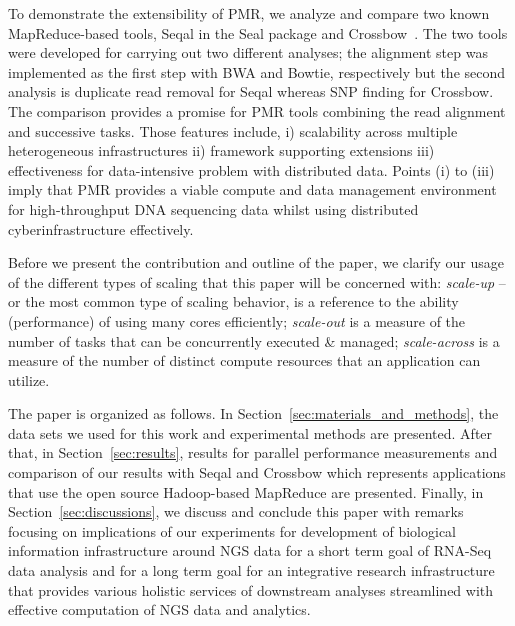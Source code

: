 \documentclass{acm_proc_article-sp}
\begin{document}

To demonstrate the extensibility of PMR, we analyze and compare two
known MapReduce-based tools, Seqal in the Seal package and
Crossbow~\cite{seal2011,langmead2010}.  The two tools were developed
for carrying out two different analyses; the alignment step was
implemented as the first step with BWA and Bowtie, respectively but
the second analysis is duplicate read removal for Seqal whereas SNP
finding for Crossbow.  The comparison provides a promise for PMR tools
combining the read alignment and successive tasks.  Those features
include, i) scalability across multiple heterogeneous infrastructures
ii) framework supporting extensions iii) effectiveness for
data-intensive problem with distributed data. Points (i) to (iii)
imply that PMR provides a viable compute and data management
environment for high-throughput DNA sequencing data whilst using
distributed cyberinfrastructure effectively.


Before we present the contribution and outline of the paper, we
clarify our usage of the different types of scaling that this paper
will be concerned with: {\it scale-up} -- or the most common type of
scaling behavior, is a reference to the ability (performance) of using
many cores efficiently; {\it scale-out} is a measure of the number of
tasks that can be concurrently executed \& managed; {\it scale-across}
is a measure of the number of distinct compute resources that an
application can utilize.




The paper is organized as follows. In
Section~\ref{sec:materials_and_methods}, the data sets we used for
this work and experimental methods are presented.
After that, in Section~\ref{sec:results}, results for parallel performance
measurements and comparison of our results with Seqal and Crossbow
which represents applications that use the open source Hadoop-based
MapReduce\cite{hadoop-url, taylor2010,seal_2011_mapred,seal2011} are
presented.  Finally, in Section~\ref{sec:discussions}, we 
discuss and conclude this paper with remarks focusing on
implications of our experiments for development of biological
information infrastructure around NGS data for a short term goal of
RNA-Seq data analysis and for a long term goal for an integrative
research infrastructure that provides various holistic services of
downstream analyses streamlined with effective computation of NGS data
and analytics.
\end{document}
